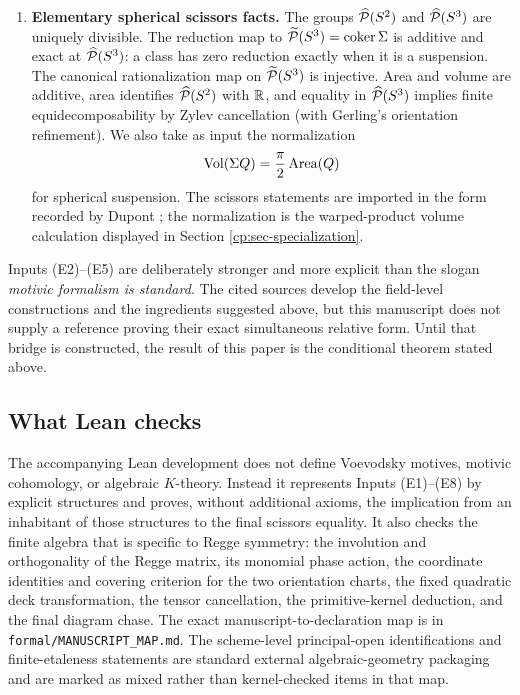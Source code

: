 \begin{enumerate}[label=\textup{(E\arabic*)},leftmargin=3.1em]
\item \textbf{Elementary spherical scissors facts.}
\label{cp:input-E8}
The groups \(\widehat{\mathcal P}(S^2)\) and \(\widehat{\mathcal P}(S^3)\) are uniquely divisible.  The
reduction map to \(\widetilde{\mathcal P}(S^3)=\operatorname{coker}\Sigma\) is additive and
exact at \(\widehat{\mathcal P}(S^3)\): a class has zero reduction exactly when it is a
suspension.  The canonical rationalization map on \(\widetilde{\mathcal P}(S^3)\) is
injective.  Area and volume are additive, area identifies
\(\widehat{\mathcal P}(S^2)\) with \(\mathbb R\), and equality in
\(\widehat{\mathcal P}(S^3)\) implies finite equidecomposability by Zylev cancellation
(with Gerling's orientation refinement).  We also take as input the
normalization
\[
 \operatorname{Vol}(\Sigma Q)=\frac\pi2\operatorname{Area}(Q)
\]
for spherical suspension.  The scissors statements are imported in the
form recorded by Dupont \cite{Dupont2001}; the normalization is the
warped-product volume calculation displayed in Section
\ref{cp:sec-specialization}.
\end{enumerate}

Inputs \textup{(E2)--(E5)} are deliberately stronger and more explicit
than the slogan \emph{motivic formalism is standard}.  The cited sources
develop the field-level constructions and the ingredients suggested above,
but this manuscript does not supply a reference proving their exact
simultaneous relative form.  Until that bridge is constructed, the result
of this paper is the conditional theorem stated above.

\subsection{What Lean checks}

The accompanying Lean development does not define Voevodsky motives,
motivic cohomology, or algebraic \(K\)-theory.  Instead it represents
Inputs \textup{(E1)--(E8)} by explicit structures and proves, without
additional axioms, the implication from an inhabitant of those structures
to the final scissors equality.  It also checks the finite algebra that is
specific to Regge symmetry: the involution and orthogonality of the Regge
matrix, its monomial phase action, the coordinate identities and covering
criterion for the two orientation charts, the fixed quadratic deck
transformation, the tensor cancellation, the
primitive-kernel deduction, and the final diagram chase.  The exact
manuscript-to-declaration map is in \texttt{formal/MANUSCRIPT\_MAP.md}.
The scheme-level principal-open identifications and finite-etaleness
statements are standard external algebraic-geometry packaging and are marked
as mixed rather than kernel-checked items in that map.

